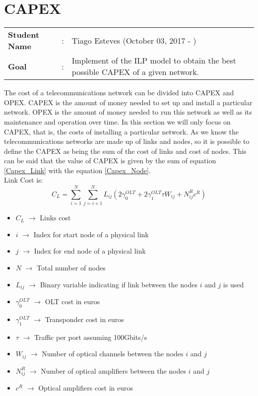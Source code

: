 \clearpage

\section{CAPEX}
\begin{tcolorbox}	
\begin{tabular}{p{2.75cm} p{0.2cm} p{10.5cm}} 	
\textbf{Student Name}  &:& Tiago Esteves    (October 03, 2017 - )\\
\textbf{Goal}          &:& Implement of the ILP model to obtain the best possible CAPEX of a given network.
\end{tabular}
\end{tcolorbox}
\vspace{11pt}

The cost of a telecommunications network can be divided into CAPEX and OPEX.
CAPEX is the amount of money needed to set up and install a particular network.
OPEX is the amount of money needed to run this network as well as its maintenance and operation over time.
In this section we will only focus on CAPEX, that is, the costs of installing a particular network.
As we know the telecommunications networks are made up of links and nodes, so it is possible to define the CAPEX as being the sum of the cost of links and cost of nodes.
This can be said that the value of CAPEX is given by the sum of equation \ref{Capex_Link} with the equation \ref{Capex_Node}.\\

Link Cost is:\\

\begin{equation}
C_L = \sum_{i=1}^N \sum_{j=i+1}^N L_{ij} ( 2 \gamma_0^{OLT} + 2 \gamma_1^{OLT} \tau W_{ij} + N^R_{ij} c^R )
\label{Capex_Link}
\end{equation}


\vspace{10pt}
\begin{itemize}
\item{$C_L$				$\rightarrow$	Links cost}
\item{$i$               $\rightarrow$   Index for start node of a physical link}
\item{$j$               $\rightarrow$   Index for end node of a physical link}
\item{$N$				$\rightarrow$	Total number of nodes}
\item{$L_{ij}$			$\rightarrow$	Binary variable indicating if link between the nodes $i$ and $j$ is used}
\item{$\gamma_0^{OLT}$	$\rightarrow$	OLT cost in euros}
\item{$\gamma_1^{OLT}$	$\rightarrow$	Transponder cost in euros}
\item{$\tau$		    $\rightarrow$	Traffic per port assuming 100Gbits/s}
\item{$W_{ij}$          $\rightarrow$   Number of optical channels between the nodes $i$ and $j$}
\item{$N^R_{ij}$    	$\rightarrow$	Number of optical amplifiers between the nodes $i$ and $j$}
\item{$c^R$				$\rightarrow$	Optical amplifiers cost in euros}
\end{itemize}


